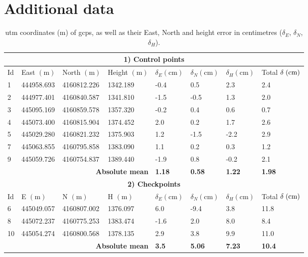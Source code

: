 \FloatBarrier
\section*{Additional data}

\renewcommand{\arraystretch}{1.2}
\begin{table}[!htbp]
    \centering
    \caption{\acrshort{utm} coordinates (m) of \acrshort{gcp}s, as well as their East, North and height error in centimetres ($\delta_E$, $\delta_N$, $\delta_H$).}
    \label{table:point_coordinates}
    \begin{tabular}{llllllll}
    \toprule
    \multicolumn{8}{c}{\textbf{1) Control points}}\\
    \midrule
    Id & East $(\si{\metre})$ & North $(\si{\metre})$ & Height $(\si{\metre})$ & $\delta_E (\si{\centi\metre})$ & $\delta_N (\si{\centi\metre})$ & $\delta_H (\si{\centi\metre})$ & Total $\delta \hspace{1mm} (\si{\centi\metre})$\\
    \midrule
            1 & 444958.693 & 4160812.226 & 1342.189 & -0.4 & 0.5 & 2.3 & 2.4 \\
            2 & 444977.401 & 4160840.587 & 1341.810 & -1.5 & -0.5 & 1.3 & 2.0 \\
            3 & 445095.169 & 4160859.578 & 1357.320 & -0.2 & 0.4 & 0.6 & 0.7 \\
            4 & 445073.400 & 4160815.904 & 1374.452 & 2.0 & 0.2 & 1.7 & 2.6 \\
            5 & 445029.280 & 4160821.232 & 1375.903 & 1.2 & -1.5 & -2.2 & 2.9 \\
            7 & 445063.855 & 4160795.858 & 1383.090 & 1.1 & 0.2 & 0.3 & 1.2 \\
            9 & 445059.726 & 4160754.837 & 1389.440 & -1.9 & 0.8 & -0.2 & 2.1\\
    \midrule
    \multicolumn{4}{r}{\textbf{Absolute mean}} & \textbf{1.18} & \textbf{0.58} & \textbf{1.22} & \textbf{1.98} \\
    \midrule
    \multicolumn{8}{c}{\textbf{2) Checkpoints}}\\
    \midrule
    Id & E $(\si{\metre})$ & N $(\si{\metre})$ & H $(\si{\metre})$ & $\delta_E (\si{\centi\metre})$ & $\delta_N (\si{\centi\metre})$ & $\delta_H (\si{\centi\metre})$ & Total $\delta \hspace{1mm} (\si{\centi\metre})$\\
    \midrule
            6 & 445049.057 & 4160807.002 & 1376.097 & 6.0 & -9.4 & 3.8 & 11.8 \\
            8 & 445072.237 & 4160775.253 & 1383.474 & -1.6 & 2.0 & 8.0 & 8.4 \\
            10 & 445054.274 & 4160800.568 & 1378.135 & 2.9 & 3.8 & 9.9 & 11.0 \\
    \midrule
    \multicolumn{4}{r}{\textbf{Absolute mean}} & \textbf{3.5} & \textbf{5.06} & \textbf{7.23} & \textbf{10.4} \\
    \bottomrule
    \end{tabular}
    \normalsize
\end{table}
\renewcommand{\arraystretch}{1}
